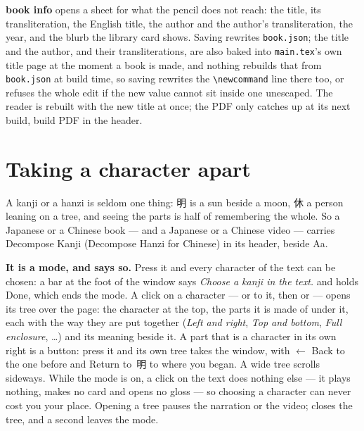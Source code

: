 \documentclass[11pt,oneside]{report}
\newcommand{\jw}[1]{\mbox{\foreignlanguage{japanese}{#1}}}
\newcommand{\file}[1]{\texttt{#1}}
\newcommand{\key}[1]{\textsf{\small\fbox{#1}}}
\newcommand{\menu}[1]{\textsf{#1}}
\begin{document}
\textbf{book info} opens a sheet for what the pencil does not reach: the
title, its transliteration, the English title, the author and the author's
transliteration, the year, and the blurb the library card shows. Saving
rewrites \file{book.json}; the title and the author, and their
transliterations, are also baked into \file{main.tex}'s own title page at
the moment a book is made, and nothing rebuilds that from \file{book.json}
at build time, so saving rewrites the \verb|\newcommand| line there too, or
refuses the whole edit if the new value cannot sit inside one unescaped.
The reader is rebuilt with the new title at once; the PDF only catches up
at its next build, \menu{build PDF} in the header.

\section{Taking a character apart}
\label{sec:decompose}

A kanji or a hanzi is seldom one thing: \jw{明} is a sun beside a moon,
\jw{休} a person leaning on a tree, and seeing the parts is half of
remembering the whole. So a Japanese or a Chinese book --- and a Japanese or
a Chinese video --- carries \menu{Decompose Kanji} (\menu{Decompose Hanzi}
for Chinese) in its header, beside \menu{Aa}.

\textbf{It is a mode, and says so.} Press it and every character of the text
can be chosen: a bar at the foot of the window says \emph{Choose a kanji in
the text.} and holds \menu{Done}, which ends the mode. A click on a character
--- or \key{Tab} to it, then \key{Enter} or \key{Space} --- opens its tree
over the page: the character at the top, the parts it is made of under it,
each with the way they are put together (\emph{Left and right}, \emph{Top and
bottom}, \emph{Full enclosure}, \ldots) and its meaning beside it. A part that
is a character in its own right is a button: press it and its own tree takes
the window, with \menu{$\leftarrow$ Back} to the one before and
\menu{Return to}~\jw{明} to where you began. A wide tree scrolls sideways.
While the mode is on, a click on the text does nothing else --- it plays
nothing, makes no card and opens no gloss --- so choosing a character can
never cost you your place. Opening a tree pauses the narration or the video;
\key{Esc} closes the tree, and a second \key{Esc} leaves the mode.
\end{document}
